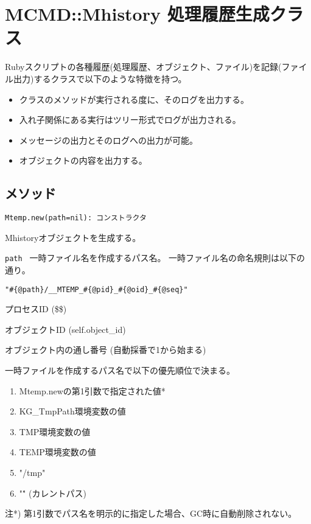 \documentclass[a4paper]{jarticle}
\begin{document}
\setlength{\baselineskip}{4.7mm}

\section*{MCMD::Mhistory 処理履歴生成クラス}
Rubyスクリプトの各種履歴(処理履歴、オブジェクト、ファイル)を記録(ファイル出力)するクラスで以下のような特徴を持つ。
\begin{itemize}
	\setlength{\itemindent}{-5mm}
	\item クラスのメソッドが実行される度に、そのログを出力する。
	\item 入れ子関係にある実行はツリー形式でログが出力される。
	\item メッセージの出力とそのログへの出力が可能。
	\item オブジェクトの内容を出力する。
\end{itemize}

\subsection*{メソッド}

{\large\color{blue}
\begin{verbatim}
Mtemp.new(path=nil): コンストラクタ
\end{verbatim}
}
Mhistoryオブジェクトを生成する。

\begin{description}
	\setlength{\itemindent}{-5mm}
	\item {\large \verb/path /} 一時ファイル名を作成するパス名。
一時ファイル名の命名規則は以下の通り。

\verb|"#{@path}/__MTEMP_#{@pid}_#{@oid}_#{@seq}"|
\begin{description}
	\setlength{\itemindent}{+5mm}
	\item [@pid] プロセスID (\$\$)
	\item [@oid] オブジェクトID (self.object\_id)
	\item [@seq] オブジェクト内の通し番号 (自動採番で1から始まる)
	\item [@path] 一時ファイルを作成するパス名で以下の優先順位で決まる。
\end{description}

\begin{enumerate}
	\setlength{\itemindent}{+15mm}
	\item Mtemp.newの第1引数で指定された値*
	\item KG\_TmpPath環境変数の値
	\item TMP環境変数の値
	\item TEMP環境変数の値
	\item "/tmp"
	\item "\." (カレントパス)
\end{enumerate}

注*) 第1引数でパス名を明示的に指定した場合、GC時に自動削除されない。
\end{description}
\end{document}
